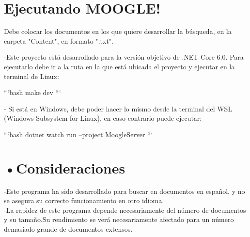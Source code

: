 \documentclass[aspectratio = 169, 14pt]{article}
\begin{document}
\begin{Large}
\section{Ejecutando MOOGLE!}
Debe colocar los documentos en los que quiere desarrollar la búsqueda, en la carpeta
"Content", en formato ".txt".  

-Este proyecto está desarrollado para la versión objetivo de .NET Core 6.0. Para ejecutarlo debe ir a la ruta en la que está ubicada el proyecto y ejecutar en la terminal de Linux:

\begin{flushleft}
```bash\newline
make dev
```

- Si está en Windows, debe poder hacer lo mismo desde la terminal del WSL (Windows Subsystem for Linux), en caso contrario puede ejecutar:

```bash\newline
dotnet watch run --project MoogleServer
```
\end{flushleft}
\section{•Consideraciones}
-Este programa ha sido desarrollado para
buscar en documentos en español, y no se
asegura su correcto funcionamiento en otro
idioma.\\
\newline
-La rapidez de este programa depende
necesariamente del número de documentos y
su tamaño.Su rendimiento se
verá necesariamente afectado para un número demasiado
grande de documentos extensos.
\end{Large}
\end{document}

